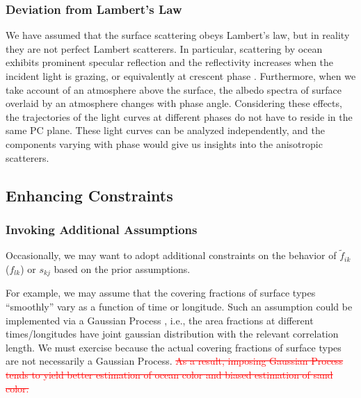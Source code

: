 \documentclass[iop,numberedappendix,apj]{emulateapj}
\def\fast{\tilde f}
\def\edit#1{\textcolor{red}{#1}}
\begin{document}
\subsubsection{Deviation from Lambert's Law}
\label{ss:deviate_Lambert}

We have assumed that the surface scattering obeys Lambert's law, but in reality they are not perfect Lambert scatterers. 
In particular, scattering by ocean exhibits prominent specular reflection and the reflectivity increases when the incident light is grazing, or equivalently at crescent phase \citep[e.g.,][]{Williams2008,Robinson2010,Robinson2014}. 
Furthermore, when we take account of an atmosphere above the surface, the albedo spectra of surface overlaid by an atmosphere changes with phase angle.  
Considering these effects, the trajectories of the light curves at different phases do not have to reside in the same PC plane. 
These light curves can be analyzed independently, and the components varying with phase would give us insights into the anisotropic scatterers. 




\subsection{Enhancing Constraints}
\label{ss:enhancing_constraints}

\subsubsection{Invoking Additional Assumptions}

Occasionally, we may want to adopt additional constraints on the behavior of $\fast _{ik}$ ($f_{lk}$) or $s_{kj}$ based on the prior assumptions. 

For example, we may assume that the covering fractions of surface types  ``smoothly'' vary as a function of time or longitude. 
Such an assumption could be implemented via a Gaussian Process \citep[e.g.,][]{Rasmussen2005}, i.e., the area fractions at different times/longitudes have joint gaussian distribution with the relevant correlation length. 
We must exercise because the actual covering fractions of surface types are not necessarily a Gaussian Process. 
\edit{\sout{As a result, imposing Gaussian Process tends to yield better estimation of ocean color and biased estimation of \edit{sand} color. }}
\end{document}
